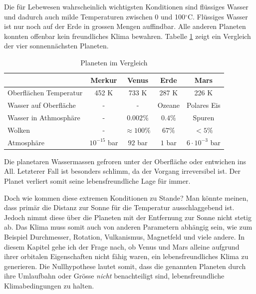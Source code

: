 \begin{refsection}
Die für Lebewesen wahrscheinlich wichtigsten Konditionen sind flüssiges Wasser und dadurch auch milde Temperaturen zwischen 0 und 100$^\circ$C. Flüssiges Wasser ist nur noch auf der Erde in grossen Mengen auffindbar.
Alle anderen Planeten konnten offenbar kein freundliches Klima bewahren. Tabelle \ref{planeten_comparison} zeigt ein Vergleich der vier sonnennächsten Planeten.
\begin{center}
\begin{table}
	\center
	\begin{tabular}{l|c c c c}
							& Merkur			& Venus				& Erde		& Mars                  \\
  \hline
  Oberflächen Temperatur	& 452 K				& 733 K				& 287 K		& 226 K                 \\
  Wasser auf Oberfläche		& -					& -					& Ozeane	& Polares Eis			\\
  Wasser in Athmosphäre		& -					& $0.002\%$ 		& $0.4\%$	& Spuren				\\
  Wolken					& -					& $\approx100\%$	& $67\%$  	& $<5\%$                \\
  Atmosphäre				& $10^{-15}$ bar	& $92$ bar			& $1$ bar	& $6 \cdot 10^{-3}$ bar 
\end{tabular}
\caption{Planeten im Vergleich \cite{planeten:temperatures} \cite{planeten:cloudcover}}
\label{planeten_comparison}
\end{table}
\end{center}
Die planetaren Wassermassen gefroren unter der Oberfläche oder entwichen ins All. Letzterer Fall ist besonders schlimm, da der Vorgang irreversibel ist. Der Planet verliert somit seine lebensfreundliche Lage für immer.

Doch wie kommen diese extremen Konditionen zu Stande? Man könnte meinen, dass primär die Distanz zur Sonne für die Temperatur ausschlaggebend ist. Jedoch nimmt diese über die Planeten mit der Entfernung zur Sonne nicht stetig ab.
Das Klima muss somit auch von anderen Parametern abhängig sein, wie zum Beispiel Durchmesser, Rotation, Vulkanismus, Magnetfeld und viele andere.
In diesem Kapitel gehe ich der Frage nach, ob Venus und Mars alleine aufgrund ihrer orbitalen Eigenschaften nicht fähig waren, ein lebensfreundliches Klima zu generieren. Die Nullhypothese lautet somit, dass die genannten Planeten durch ihre Umlaufbahn oder Grösse \textit{nicht} benachteiligt sind, lebensfreundliche Klimabedingungen zu halten.


\end{refsection}
